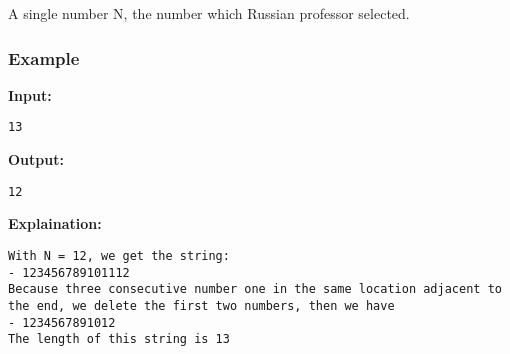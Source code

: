     A single number N, the number which Russian professor selected.   



\subsubsection{    Example   }

\textbf{    Input:   }
\begin{verbatim}
13\end{verbatim}

\textbf{    Output:   }
\begin{verbatim}
12\end{verbatim}

\textbf{    Explaination:   }
\begin{verbatim}
With N = 12, we get the string:
- 123456789101112
Because three consecutive number one in the same location adjacent to the end, we delete the first two numbers, then we have
- 1234567891012
The length of this string is 13\end{verbatim}
